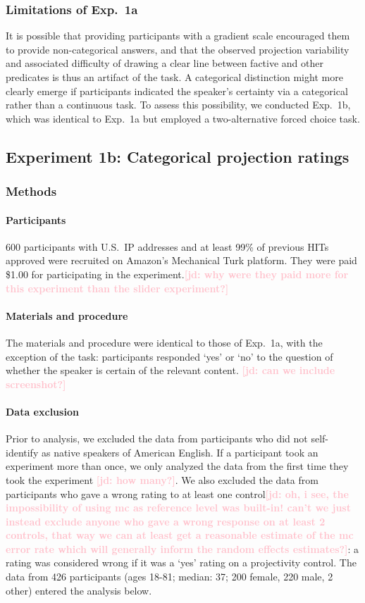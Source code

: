 \documentclass[11pt,fleqn]{article}
\newcommand{\jd}[1]{\textbf{\textcolor{Pink}{[jd: #1]}}}
\newcommand{\6}{\mbox{$[\hspace*{-.6mm}[$}}
\newcommand{\9}{\mbox{$]\hspace*{-.6mm}]$}}
\begin{document}
\subsubsection{Limitations of Exp.~1a}

It is possible that providing participants with a gradient scale encouraged them to provide non-categorical answers, and that the observed projection variability and associated difficulty of drawing a clear line between factive and other predicates is thus an artifact of the task. A categorical distinction might more clearly emerge if participants indicated the speaker's certainty via a categorical rather than a continuous task. To assess this possibility, we conducted Exp.~1b, which was identical to Exp.~1a but employed a two-alternative forced choice task.

\subsection{Experiment 1b: Categorical projection ratings}

\subsubsection{Methods}

\paragraph{Participants} 600 participants with U.S.\ IP addresses and at least 99\% of previous HITs approved were recruited on Amazon's Mechanical Turk platform. They were paid \$1.00 for participating in the experiment.\jd{why were they paid more for this experiment than the slider experiment?}


\paragraph{Materials and procedure} The materials and procedure were identical to those of Exp.~1a, with the exception of the task: participants responded `yes' or `no' to the question of whether the speaker is certain of the relevant content. \jd{can we include screenshot?}

\paragraph{Data exclusion} Prior to analysis, we excluded the data from participants who did not self-identify as native speakers of American English. If a participant took an experiment more than once, we only analyzed the data from the first time they took the experiment \jd{how many?}. We also excluded the data from participants who gave a wrong rating to at least one control\jd{oh, i see, the impossibility of using mc as reference level was built-in! can't we just instead exclude anyone who gave a wrong response on at least 2 controls, that way we can at least get a reasonable estimate of the mc error rate which will generally inform the random effects estimates?}: a rating was considered wrong if it was a `yes' rating on a projectivity control. The data from 426 participants (ages 18-81; median: 37; 200 female, 220 male, 2 other) entered the analysis below. 
\end{document}
